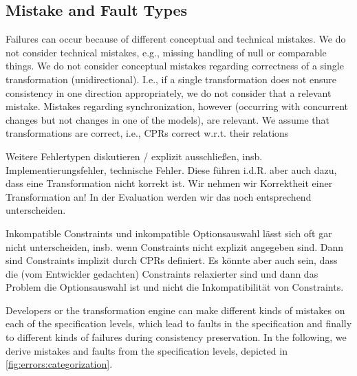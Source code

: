 \subsection{Mistake and Fault Types}
\label{chap:errors:categorization:mistakes}

Failures can occur because of different conceptual and technical mistakes.
We do not consider technical mistakes, e.g., missing handling of null or comparable things.
We do not consider conceptual mistakes regarding correctness of a single transformation (unidirectional). I.e., if a single transformation does not ensure consistency in one direction appropriately, we do not consider that a relevant mistake. Mistakes regarding synchronization, however (occurring with concurrent changes but not changes in one of the models), are relevant.
We assume that transformations are correct, i.e., CPRs correct w.r.t. their relations

Weitere Fehlertypen diskutieren / explizit ausschließen, insb. Implementierungsfehler, technische Fehler. Diese führen i.d.R. aber auch dazu, dass eine Transformation nicht korrekt ist.
Wir nehmen wir Korrektheit einer Transformation an!
In der Evaluation werden wir das noch entsprechend unterscheiden.

Inkompatible Constraints und inkompatible Optionsauswahl lässt sich oft gar nicht unterscheiden, insb. wenn Constraints nicht explizit angegeben sind. Dann sind Constraints implizit durch CPRs definiert. Es könnte aber auch sein, dass die (vom Entwickler gedachten) Constraints relaxierter sind und dann das Problem die Optionsauswahl ist und nicht die Inkompatibilität von Constraints.



Developers or the transformation engine can make different kinds of mistakes on each of the specification levels, which lead to faults in the specification and finally to different kinds of failures during consistency preservation.
In the following, we derive mistakes and faults from the specification levels, depicted in \autoref{fig:errors:categorization}.

